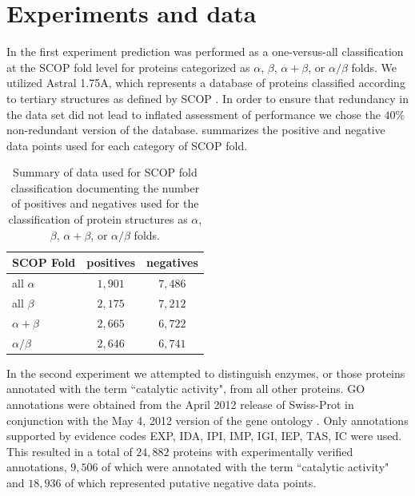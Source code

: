 \section{Experiments and data}

In the first experiment prediction was performed as a one-versus-all classification at the SCOP fold level for proteins categorized as $\alpha$, $\beta$, $\alpha+\beta$, or $\alpha/\beta$ folds. We utilized Astral 1.75A, which represents a database of proteins classified according to tertiary structures as defined by SCOP \citep{murzin1995scop}.  In order to ensure that redundancy in the data set did not lead to inflated assessment of performance we chose the $40\%$ non-redundant version of the database.  summarizes the positive and negative data points used for each category of SCOP fold.

\begin{table}[h]
\centering
	\begin{tabular}{|l||c|c|}

		\hline		
		SCOP Fold & positives & negatives\\
		\hline
		\hline
		all $\alpha$ & $1,901$ & $7,486$\\
		all $\beta$ & $2,175$ & $7,212$\\
		$\alpha+\beta$ & $2,665$ & $6,722$\\
		$\alpha/\beta$ & $2,646$ & $6,741$\\
		\hline    
	\end{tabular}

 \caption[Summary of data used for SCOP fold classification]{Summary of data used for SCOP fold classification documenting the number of positives and negatives used for the classification of protein structures as $\alpha$, $\beta$, $\alpha+\beta$, or $\alpha/\beta$ folds. }
\label{tab:vqdata}
\end{table}

In the second experiment we attempted to distinguish enzymes, or those proteins annotated with the term ``catalytic activity", from all other proteins. GO annotations were obtained from the April 2012 release of Swiss-Prot \citep{bairoch2005universal} in conjunction with the  May 4, 2012 version of the gene ontology \citep{Ashburner2000}.  Only annotations supported by evidence codes EXP, IDA, IPI, IMP, IGI, IEP, TAS, IC were used. This resulted in a total of $24,882$ proteins with experimentally verified annotations, $9,506$ of which were annotated with the term ``catalytic activity" and $18,936$ of which represented putative negative data points. 

